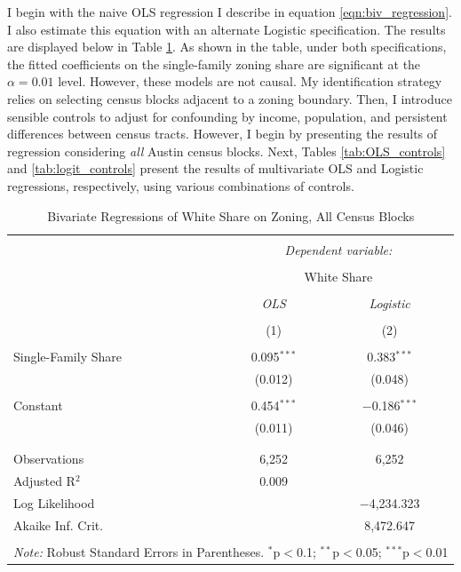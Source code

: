 \documentclass[11pt]{article}
\begin{document}
I begin with the naive OLS regression I describe in equation \ref{eqn:biv_regression}. I also estimate this equation with an alternate Logistic specification. The results are displayed below in Table \ref{tab:naive_biv}. As shown in the table, under both specifications, the fitted coefficients on the single-family zoning share are significant at the $\alpha=0.01$ level. However, these models are not causal. My identification strategy relies on selecting census blocks adjacent to a zoning boundary. Then, I introduce sensible controls to adjust for confounding by income, population, and persistent differences between census tracts. However, I begin by presenting  the results of regression considering \textit{all} Austin census blocks. Next, Tables \ref{tab:OLS_controls} and \ref{tab:logit_controls} present the results of multivariate OLS and Logistic regressions, respectively, using various combinations of controls.

\begin{table}[!htbp] \centering 
  \caption{Bivariate Regressions of White Share on Zoning, All Census Blocks}
  \label{tab:naive_biv} 
\begin{tabular}{@{\extracolsep{5pt}}lcc} 
\\[-1.8ex]\hline 
\hline \\[-1.8ex] 
 & \multicolumn{2}{c}{\textit{Dependent variable:}} \\ 
\cline{2-3} 
\\[-1.8ex] & \multicolumn{2}{c}{White Share} \\ 
\\[-1.8ex] & \textit{OLS} & \textit{Logistic} \\ 
\\[-1.8ex] & (1) & (2)\\ 
\hline \\[-1.8ex] 
 Single-Family Share & 0.095$^{***}$ & 0.383$^{***}$ \\ 
  & (0.012) & (0.048) \\ 
  & & \\ 
 Constant & 0.454$^{***}$ & $-$0.186$^{***}$ \\ 
  & (0.011) & (0.046) \\ 
  & & \\ 
\hline \\[-1.8ex] 
Observations & 6,252 & 6,252 \\ 
Adjusted R$^{2}$ & 0.009 &  \\ 
Log Likelihood &  & $-$4,234.323 \\ 
Akaike Inf. Crit. &  & 8,472.647 \\  
\hline 
\hline \\[-1.8ex] 
\multicolumn{3}{l}{\textit{Note:} Robust Standard Errors in Parentheses. $^{*}$p$<$0.1; $^{**}$p$<$0.05; $^{***}$p$<$0.01} \\ 
\end{tabular} 
\end{table} 
\end{document}
